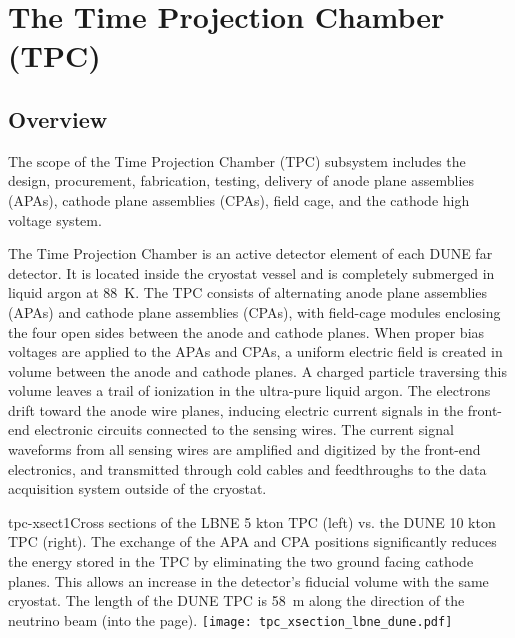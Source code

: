 
\section{The Time Projection Chamber (TPC)} 
\label{sec:detectors-fd-ref-tpc}

\subsection{Overview}

The scope of the Time Projection Chamber (TPC) subsystem includes the design, procurement, fabrication, testing, delivery of  anode plane assemblies (APAs),  cathode plane assemblies (CPAs), field cage, and the cathode high voltage system.  

The Time Projection Chamber is an active detector element of each DUNE far detector. It is located inside the cryostat 
vessel and is completely submerged in liquid argon at 88~K. The TPC consists of alternating anode plane 
assemblies (APAs) and cathode plane assemblies (CPAs), with field-cage modules enclosing the four open sides between the anode and cathode planes.
When proper bias voltages are applied to the APAs and CPAs, a uniform electric field is created in volume between the anode and cathode planes. A charged particle traversing this volume leaves a trail of 
ionization in the ultra-pure liquid argon.  The electrons drift toward the anode wire planes, inducing electric current signals in the front-end electronic circuits connected to the sensing wires.  The current 
signal waveforms from all sensing wires are amplified and digitized by the front-end electronics, and transmitted through cold cables and feedthroughs to the data acquisition system outside of the cryostat.


\begin{cdrfigure}{tpc-xsect1}{Cross sections of the LBNE 5 kton TPC (left) vs. the DUNE 10 kton TPC (right).  The exchange of the APA and CPA positions significantly reduces the energy stored in the TPC by eliminating the two ground facing cathode planes. This allows an increase in the detector's fiducial volume with the same cryostat.  The length of the DUNE TPC is  58~m along the direction of the neutrino beam (into the page).}
\texttt{[image: tpc\_xsection\_lbne\_dune.pdf]}
\end{cdrfigure}


